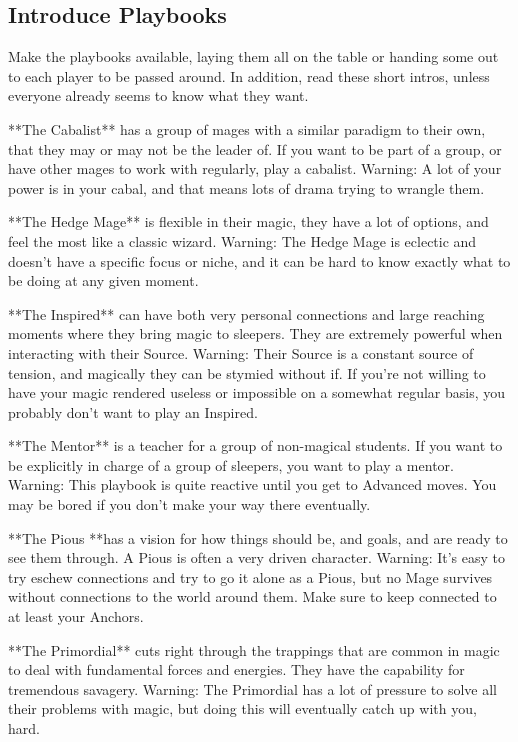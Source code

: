 \documentclass[
  oneside,
  statementpaper,
  9pt]{memoir}
\begin{document}
\hypertarget{introduce-playbooks}{%
\subsection{Introduce Playbooks}\label{introduce-playbooks}}

\begin{MC}

Make the playbooks available, laying them all on the table or handing some out to each player to be passed around. In addition, read these short intros, unless everyone already seems to know what they want.

**The Cabalist** has a group of mages with a similar paradigm to their own, that they may or may not be the leader of. If you want to be part of a group, or have other mages to work with regularly, play a cabalist. Warning: A lot of your power is in your cabal, and that means lots of drama trying to wrangle them.

**The Hedge Mage** is flexible in their magic, they have a lot of options, and feel the most like a classic wizard. Warning: The Hedge Mage is eclectic and doesn’t have a specific focus or niche, and it can be hard to know exactly what to be doing at any given moment.

**The Inspired** can have both very personal connections and large reaching moments where they bring magic to sleepers. They are extremely powerful when interacting with their Source. Warning: Their Source is a constant source of tension, and magically they can be stymied without if. If you’re not willing to have your magic rendered useless or impossible on a somewhat regular basis, you probably don’t want to play an Inspired.

**The Mentor** is a teacher for a group of non-magical students. If you want to be explicitly in charge of a group of sleepers, you want to play a mentor. Warning: This playbook is quite reactive until you get to Advanced moves. You may be bored if you don’t make your way there eventually.

**The Pious **has a vision for how things should be, and goals, and are ready to see them through. A Pious is often a very driven character. Warning: It’s easy to try eschew connections and try to go it alone as a Pious, but no Mage survives without connections to the world around them. Make sure to keep connected to at least your Anchors.

**The Primordial** cuts right through the trappings that are common in magic to deal with fundamental forces and energies. They have the capability for tremendous savagery. Warning: The Primordial has a lot of pressure to solve all their problems with magic, but doing this will eventually catch up with you, hard.


\end{MC}
\end{document}
